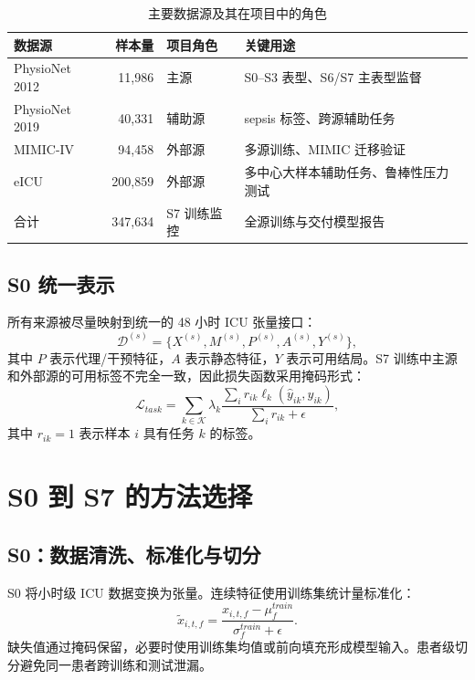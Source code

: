 \documentclass[11pt,a4paper]{article}
\newcommand{\reporttablesize}{\small}
\begin{document}
\begin{table}[H]
\centering
\caption{主要数据源及其在项目中的角色}
\label{tab:datasets}
\reporttablesize
\setlength{\tabcolsep}{5pt}
\renewcommand{\arraystretch}{1.12}
\begin{tabularx}{\textwidth}{@{}l r l Y@{}}
\toprule
数据源 & 样本量 & 项目角色 & 关键用途\\
\midrule
PhysioNet 2012 & 11,986 & 主源 & S0--S3 表型、S6/S7 主表型监督\\
PhysioNet 2019 & 40,331 & 辅助源 & sepsis 标签、跨源辅助任务\\
MIMIC-IV & 94,458 & 外部源 & 多源训练、MIMIC 迁移验证\\
eICU & 200,859 & 外部源 & 多中心大样本辅助任务、鲁棒性压力测试\\
\midrule
合计 & 347,634 & S7 训练监控 & 全源训练与交付模型报告\\
\bottomrule
\end{tabularx}
\end{table}

\subsection{S0 统一表示}
所有来源被尽量映射到统一的 48 小时 ICU 张量接口：
\begin{equation}
  \mathcal{D}^{(s)}=\{X^{(s)},M^{(s)},P^{(s)},A^{(s)},Y^{(s)}\},
\end{equation}
其中 $P$ 表示代理/干预特征，$A$ 表示静态特征，$Y$ 表示可用结局。S7 训练中主源和外部源的可用标签不完全一致，因此损失函数采用掩码形式：
\begin{equation}
  \mathcal{L}_{task}
  =
  \sum_{k\in\mathcal{K}}
  \lambda_k
  \frac{\sum_i r_{ik}\ell_k(\hat{y}_{ik},y_{ik})}{\sum_i r_{ik}+\epsilon},
\end{equation}
其中 $r_{ik}=1$ 表示样本 $i$ 具有任务 $k$ 的标签。

\section{S0 到 S7 的方法选择}
\subsection{S0：数据清洗、标准化与切分}
S0 将小时级 ICU 数据变换为张量。连续特征使用训练集统计量标准化：
\begin{equation}
  \tilde{x}_{i,t,f}=\frac{x_{i,t,f}-\mu_f^{train}}{\sigma_f^{train}+\epsilon}.
\end{equation}
缺失值通过掩码保留，必要时使用训练集均值或前向填充形成模型输入。患者级切分避免同一患者跨训练和测试泄漏。
\end{document}
